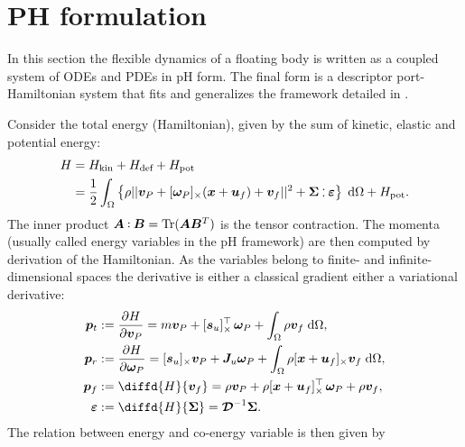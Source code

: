 \documentclass{svjour3}                     %
\DeclareMathOperator{\Tr}{Tr}
\newcommand{\crmat}[1]{\ensuremath{[#1]_{\times}}}
\def\onedot{$\mathsurround0pt\ldotp$}
\def\cddot{%
	\mathbin{\vcenter{\baselineskip.67ex
			\hbox{\onedot}\hbox{\onedot}}%
}}
\begin{document}
\section{PH formulation}
\label{sec:pH_fd}
In this section the flexible dynamics of a floating body is written as a coupled system of ODEs and PDEs in pH form. The final form is a descriptor port-Hamiltonian system that fits and generalizes the framework detailed in \cite{mehrmann2019structurepreserving}.  

Consider the total energy (Hamiltonian), given by the sum of kinetic, elastic and potential energy:
\begin{equation}
\label{eq:H}
\begin{aligned}
H &= H_{\text{kin}} + H_{\text{def}} + H_{\text{pot}} \\
&= \frac{1}{2} \int_{\Omega} \left\{\rho ||\bm{v}_P + \crmat{\bm{\omega}_P} (\bm{x}+\bm{u}_f) + {\bm{v}}_f||^2 + \bm\Sigma \cddot \bm\varepsilon \right\}  \d{\Omega} + H_{\text{pot}}.
\end{aligned}
\end{equation}
The inner product $\bm{A} \cddot \bm{B} = \Tr(\bm{A} \bm{B}^T)$ is the tensor contraction.  
The momenta (usually called energy variables in the pH framework) are then computed by derivation of the Hamiltonian. As the variables belong to finite- and infinite-dimensional spaces the derivative is either a classical gradient either a variational derivative:
\begin{equation}
\label{eq:momenta}
\begin{aligned}
\bm{p}_t &:= \diffp{H}{\bm{v}_P} = m \bm{v}_P + \crmat{\bm{s}_u}^\top \, \bm\omega_P + \int_{\Omega} \rho \bm{v}_f \d{\Omega}, \\
\bm{p}_r &:= \diffp{H}{\bm\omega_P} = \crmat{\bm{s}_u} \bm{v}_P + \bm{J}_u \bm\omega_P + \int_{\Omega} \rho \crmat{\bm{x}+\bm{u}_f} \bm{v}_f \d{\Omega}, \\
\bm{p}_f &:= \diffd{H}{\bm{v}_f} = \rho \bm{v}_P + \rho \crmat{\bm{x}+\bm{u}_f}^\top \, \bm\omega_P + \rho \bm{v}_f, \\
\bm\varepsilon &:= \diffd{H}{\bm\Sigma} = \bm{\mathcal{D}}^{-1} \bm\Sigma.
\end{aligned}
\end{equation}
The relation between energy and co-energy variable is then given by
\end{document}
